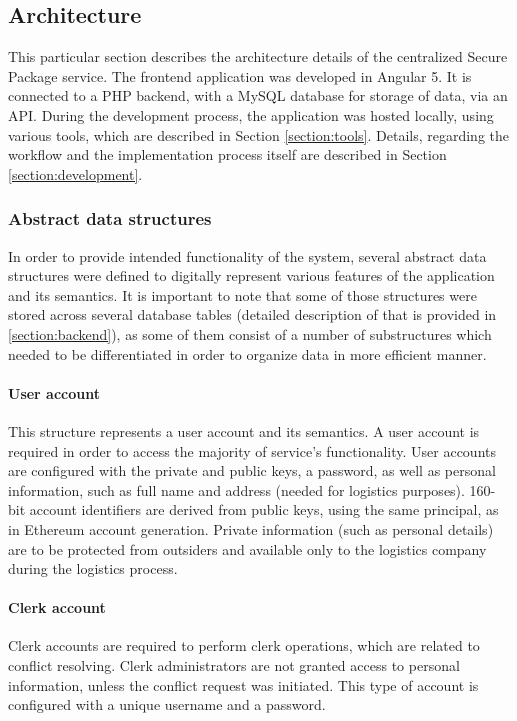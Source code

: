 \subsection{Architecture}
This particular section describes the architecture details of the centralized Secure Package service. The frontend application was developed in Angular 5. It is connected to a PHP backend, with a MySQL database for storage of data, via an API. During the development process, the application was hosted locally, using various tools, which are described in Section \ref{section:tools}. Details, regarding the workflow and the implementation process itself are described in Section \ref{section:development}.

\subsubsection{Abstract data structures} \label{section:datastructures}
In order to provide intended functionality of the system, several abstract data structures were defined to digitally represent various features of the application and its semantics. It is important to note that some of those structures were stored across several database tables (detailed description of that is provided in \ref{section:backend}), as some of them consist of a number of substructures which needed to be differentiated in order to organize data in more efficient manner.

\paragraph{User account} 
This structure represents a user account and its semantics. A user account is required in order to access the majority of service's functionality. User accounts are configured with the private and public keys, a password, as well as personal information, such as full name and address (needed for logistics purposes). 160-bit account identifiers are derived from public keys, using the same principal, as in Ethereum account generation. Private information (such as personal details) are to be protected from outsiders and available only to the logistics company during the logistics process.

\paragraph{Clerk account}
Clerk accounts are required to perform clerk operations, which are related to conflict resolving. Clerk administrators are not granted access to personal information, unless the conflict request was initiated. This type of account is configured with a unique username and a password.

